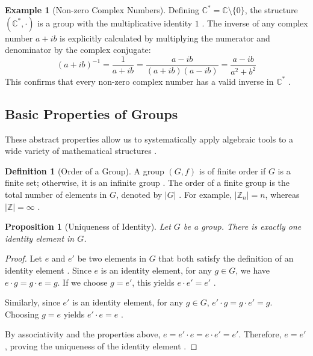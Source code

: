 \documentclass[11pt]{article}
\theoremstyle{definition}
\newtheorem{definition}{Definition}[section]
\newtheorem{example}{Example}[section]
\theoremstyle{plain}
\newtheorem{proposition}{Proposition}[theorem]
\theoremstyle{remark}
\begin{document}
\begin{example}[Non-zero Complex Numbers]
Defining $\mathbb{C}^* = \mathbb{C} \setminus \{0\}$, the structure $(\mathbb{C}^*, \cdot)$ is a group with the multiplicative identity $1$ \cite{fraleigh, dummit}. The inverse of any complex number $a+ib$ is explicitly calculated by multiplying the numerator and denominator by the complex conjugate:
\begin{equation}
    (a+ib)^{-1} = \frac{1}{a+ib} = \frac{a-ib}{(a+ib)(a-ib)} = \frac{a-ib}{a^2+b^2}
\end{equation}
This confirms that every non-zero complex number has a valid inverse in $\mathbb{C}^*$ \cite{gallian}.
\end{example}

\subsection{Basic Properties of Groups}

These abstract properties allow us to systematically apply algebraic tools to a wide variety of mathematical structures \cite{fraleigh}.

\begin{definition}[Order of a Group]
A group $(G, f)$ is of finite order if $G$ is a finite set; otherwise, it is an infinite group \cite{dummit}. The order of a finite group is the total number of elements in $G$, denoted by $|G|$ \cite{gallian}. For example, $|\mathbb{Z}_n| = n$, whereas $|\mathbb{Z}| = \infty$ \cite{fraleigh}.
\end{definition}

\begin{proposition}[Uniqueness of Identity] \label{prop:identity}
Let $G$ be a group. There is exactly one identity element in $G$.
\end{proposition}

\begin{proof}
Let $e$ and $e'$ be two elements in $G$ that both satisfy the definition of an identity element \cite{fraleigh}. Since $e$ is an identity element, for any $g \in G$, we have $e \cdot g = g \cdot e = g$. If we choose $g = e'$, this yields $e \cdot e' = e'$ \cite{dummit, fraleigh}. 

Similarly, since $e'$ is an identity element, for any $g \in G$, $e' \cdot g = g \cdot e' = g$. Choosing $g = e$ yields $e' \cdot e = e$ \cite{fraleigh}. 

By associativity and the properties above, $e = e' \cdot e = e \cdot e' = e'$. Therefore, $e = e'$, proving the uniqueness of the identity element \cite{dummit}.
\end{proof}
\end{document}
